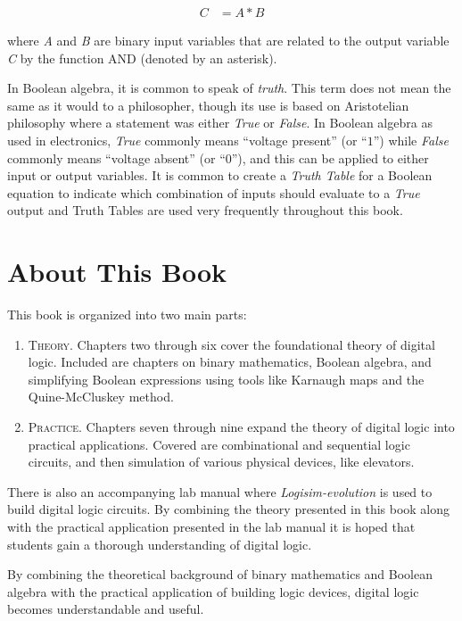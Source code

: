\begin{align}
\label{01:eq:simple_boolean_equation}
C &= A * B 
\end{align}

where \emph{A} and \emph{B} are binary input variables that are related to the output variable \emph{C} by the function \textsf{AND} (denoted by an asterisk).

In Boolean algebra, it is common to speak of \emph{truth}. This term does not mean the same as it would to a philosopher, though its use is based on Aristotelian philosophy where a statement was either \emph{True} or \emph{False}. In Boolean algebra as used in electronics, \emph{True} commonly means ``voltage present'' (or ``$ 1 $'') while \emph{False} commonly means ``voltage absent'' (or ``$ 0 $''), and this can be applied to either input or output variables. It is common to create a \emph{Truth Table} for a Boolean equation to indicate which combination of inputs should evaluate to a \emph{True} output and Truth Tables are used very frequently throughout this book.

\section{About This Book}

This book is organized into two main parts:

\begin{enumerate}
  \item \textsc{Theory}. Chapters two through six cover the foundational theory of digital logic. Included are chapters on binary mathematics, Boolean algebra, and simplifying Boolean expressions using tools like Karnaugh maps and the Quine-McCluskey method.
  
  \item \textsc{Practice}. Chapters seven through nine expand the theory of digital logic into practical applications. Covered are combinational and sequential logic circuits, and then simulation of various physical devices, like elevators.
\end{enumerate}

There is also an accompanying lab manual where \textit{Logisim-evolution} is used to build digital logic circuits. By combining the theory presented in this book along with the practical application presented in the lab manual it is hoped that students gain a thorough understanding of digital logic.

By combining the theoretical background of binary mathematics and Boolean algebra with the practical application of building logic devices, digital logic becomes understandable and useful.

